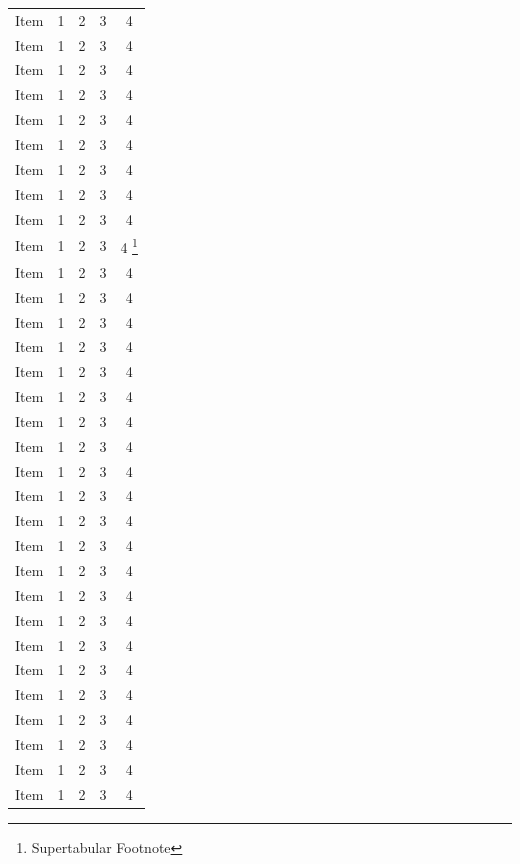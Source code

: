 \documentclass{article}
\begin{document}
	\begin{center}
	\begin{mpsupertabular}{|*{5}{c|}}
		Item & 1 & 2 & 3 & 4 \\
		Item & 1 & 2 & 3 & 4 \\
		Item & 1 & 2 & 3 & 4 \\
		Item & 1 & 2 & 3 & 4 \\
		Item & 1 & 2 & 3 & 4 \\
		Item & 1 & 2 & 3 & 4 \\
		Item & 1 & 2 & 3 & 4 \\
		Item & 1 & 2 & 3 & 4 \\
		Item & 1 & 2 & 3 & 4 \\
		Item & 1 & 2 & 3 & 4 
			\footnote{Supertabular Footnote} \\
		Item & 1 & 2 & 3 & 4 \\
		Item & 1 & 2 & 3 & 4 \\
		Item & 1 & 2 & 3 & 4 \\
		Item & 1 & 2 & 3 & 4 \\
		Item & 1 & 2 & 3 & 4 \\
		Item & 1 & 2 & 3 & 4 \\
		Item & 1 & 2 & 3 & 4 \\
		Item & 1 & 2 & 3 & 4 \\
		Item & 1 & 2 & 3 & 4 \\
		Item & 1 & 2 & 3 & 4 
			 \\
		Item & 1 & 2 & 3 & 4 \\
		Item & 1 & 2 & 3 & 4 \\
		Item & 1 & 2 & 3 & 4 \\
		Item & 1 & 2 & 3 & 4 \\
		Item & 1 & 2 & 3 & 4 \\
		Item & 1 & 2 & 3 & 4 \\
		Item & 1 & 2 & 3 & 4 \\
		Item & 1 & 2 & 3 & 4 \\
		Item & 1 & 2 & 3 & 4 \\
		Item & 1 & 2 & 3 & 4 \\
		Item & 1 & 2 & 3 & 4 \\
		Item & 1 & 2 & 3 & 4 \\
	\end{mpsupertabular}
	\parnotes
	\end{center}
\end{document}
